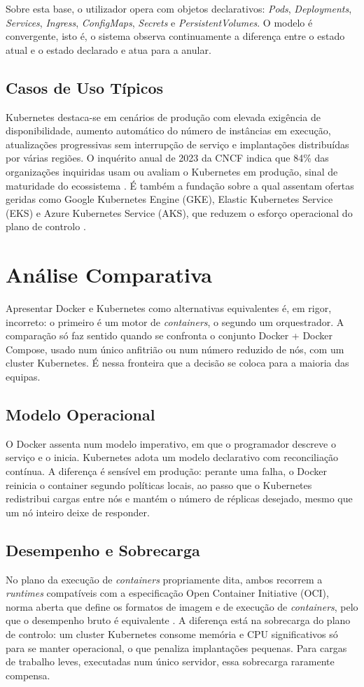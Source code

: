 \documentclass[conference]{IEEEtran}
\begin{document}
Sobre esta base, o utilizador opera com objetos declarativos: \textit{Pods}, \textit{Deployments}, \textit{Services}, \textit{Ingress}, \textit{ConfigMaps}, \textit{Secrets} e \textit{PersistentVolumes}. O modelo é convergente, isto é, o sistema observa continuamente a diferença entre o estado atual e o estado declarado e atua para a anular.

\subsection{Casos de Uso Típicos}
Kubernetes destaca-se em cenários de produção com elevada exigência de disponibilidade, aumento automático do número de instâncias em execução, atualizações progressivas sem interrupção de serviço e implantações distribuídas por várias regiões. O inquérito anual de 2023 da CNCF indica que 84\% das organizações inquiridas usam ou avaliam o Kubernetes em produção, sinal de maturidade do ecossistema \cite{cncf2023}. É também a fundação sobre a qual assentam ofertas geridas como Google Kubernetes Engine (GKE), Elastic Kubernetes Service (EKS) e Azure Kubernetes Service (AKS), que reduzem o esforço operacional do plano de controlo \cite{pahl2019}.

\section{Análise Comparativa}
Apresentar Docker e Kubernetes como alternativas equivalentes é, em rigor, incorreto: o primeiro é um motor de \textit{containers}, o segundo um orquestrador. A comparação só faz sentido quando se confronta o conjunto Docker + Docker Compose, usado num único anfitrião ou num número reduzido de nós, com um cluster Kubernetes. É nessa fronteira que a decisão se coloca para a maioria das equipas.

\subsection{Modelo Operacional}
O Docker assenta num modelo imperativo, em que o programador descreve o serviço e o inicia. Kubernetes adota um modelo declarativo com reconciliação contínua. A diferença é sensível em produção: perante uma falha, o Docker reinicia o container segundo políticas locais, ao passo que o Kubernetes redistribui cargas entre nós e mantém o número de réplicas desejado, mesmo que um nó inteiro deixe de responder.

\subsection{Desempenho e Sobrecarga}
No plano da execução de \textit{containers} propriamente dita, ambos recorrem a \textit{runtimes} compatíveis com a especificação Open Container Initiative (OCI), norma aberta que define os formatos de imagem e de execução de \textit{containers}, pelo que o desempenho bruto é equivalente \cite{felter2015}. A diferença está na sobrecarga do plano de controlo: um cluster Kubernetes consome memória e CPU significativos só para se manter operacional, o que penaliza implantações pequenas. Para cargas de trabalho leves, executadas num único servidor, essa sobrecarga raramente compensa.
\end{document}
